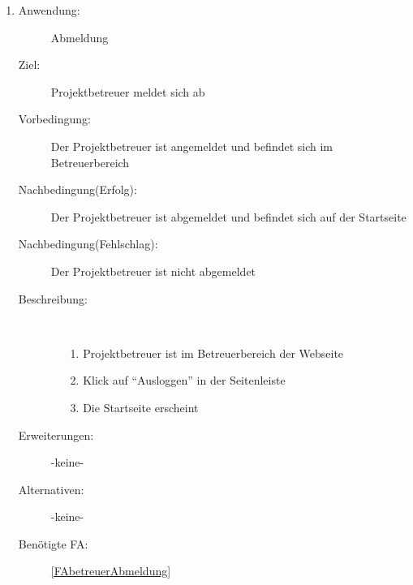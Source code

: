 \documentclass[parskip=full]{scrartcl}
\newcommand{\swtLabel}[1]{\textbf{/#1\arabic*0/}}
\begin{document}
\begin{enumerate} [label=\swtLabel{B}]
  \item \label{UCbetreuerLogout}
    \begin{description}
  	\item[Anwendung:] Abmeldung
  	\item[Ziel:] \gls{Projektbetreuer} meldet sich ab
  	\item[Vorbedingung:] Der \gls{Projektbetreuer} ist angemeldet und befindet sich im Betreuerbereich
  	\item[Nachbedingung(Erfolg):] Der \gls{Projektbetreuer} ist abgemeldet und befindet sich auf der Startseite
  	\item[Nachbedingung(Fehlschlag):] Der \gls{Projektbetreuer} ist nicht abgemeldet
  	\item[Beschreibung:]~
  	\begin{enumerate}
  	  \item[1.] \gls{Projektbetreuer} ist im Betreuerbereich der Webseite
      \item[2.] Klick auf \enquote{Ausloggen} in der Seitenleiste
      \item[3.] Die Startseite erscheint
  	\end{enumerate}
  	\item[Erweiterungen:] -keine-
  	\item[Alternativen:] -keine-
  	\item[Benötigte FA:] \ref{FAbetreuerAbmeldung}
  \end{description}
   
\end{enumerate}
\end{document}
